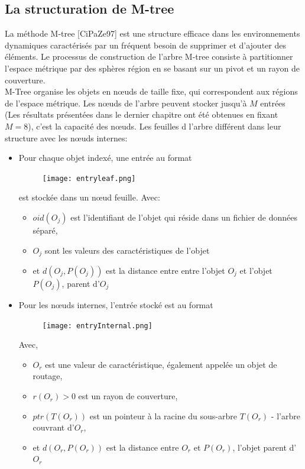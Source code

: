 \subsection{La structuration de M-tree}
La méthode M-tree [CiPaZe97] est une structure efficace dans les environnements dynamiques caractérisés par un fréquent besoin de supprimer et d'ajouter des éléments. Le processus de construction de l'arbre M-tree consiste à partitionner l'espace métrique par des sphères région en se basant sur un pivot et un rayon de couverture. \\

M-Tree organise les objets en nœuds de taille fixe, qui correspondent aux régions de l'espace métrique. Les nœuds de l'arbre peuvent stocker jusqu'à \textbf{$ M $} entrées (Les résultats présentées dans le dernier chapitre ont été obtenues en fixant $ M = 8 $), c'est la capacité des nœuds. Les feuilles d l’arbre différent dans leur structure avec les nœuds internes:
\begin{itemize}
	\item Pour chaque objet indexé, une entrée au format 
	\begin{figure}[H]
		\centering
		\texttt{[image: entryleaf.png]} %
	\end{figure} 
	est stockée dans un nœud feuille. Avec:
	\begin{itemize}
		\item \textbf{$ oid(O_j) $} est l'identifiant de l'objet qui réside dans un fichier de données séparé,
		\item \textbf{$ O_j $} sont les valeurs des caractéristiques de l'objet 
		\item et \textbf{$ d(O_j, P(O_j)) $} est la distance entre entre l’objet \textbf{$ O_j $} et l’objet  \textbf{$ P(O_j) $}, parent d'\textbf{$ O_j $}
	\end{itemize}

	\item Pour les nœuds internes, l'entrée stocké est au format
	\begin{figure}[H]
		\centering
		\texttt{[image: entryInternal.png]} %
	\end{figure} 
	Avec,
	\begin{itemize}
		\item \textbf{$ O_r $} est une valeur de caractéristique, également appelée un objet de routage,
		\item \textbf{$ r(O_r) $}$>0$ est un rayon de couverture, 
		\item \textbf{$ ptr(T( O_r)) $} est un pointeur à la racine du sous-arbre \textbf{$ T(O_r) $} - l'arbre couvrant d'\textbf{$ O_r $}, 
		\item et \textbf{$ d(O_r, P(O_r)) $} est la distance entre \textbf{$ O_r $} et \textbf{$ P(O_r) $}, l'objet parent d'\textbf{$ O_r $}\\
		
	\end{itemize}
\end{itemize}



